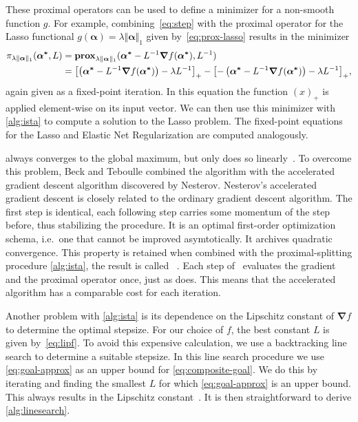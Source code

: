 These proximal operators can be used to define a minimizer for a non-smooth
function \(g\).
For example, combining~\cref{eq:step} with the proximal operator for the
Lasso functional \(g(\bm{\alpha}) = \lambda \Vert \bm{\alpha} \Vert_1\) given by~\cref{eq:prox-lasso} results in
the minimizer
\begin{align*}
  \pi_{\lambda \Vert \bm{\alpha} \Vert_1}(\bm{\alpha^*} ,L)
  &=  \prox[\(\lambda \Vert \bm{\alpha} \Vert_1\)]{\bm{\alpha^*} - L^{-1} \bm{\nabla} f (\bm{\alpha^*})}{L^{-1}} \\
  &= {\left[ \left(\bm{\alpha^*} - L^{-1} \bm{\nabla} f (\bm{\alpha^*}) \right) - \lambda L^{-1} \right]}_+ -
    {\left[ -\left(\bm{\alpha^*} - L^{-1} \bm{\nabla} f (\bm{\alpha^*}) \right) - \lambda L^{-1} \right]}_+,
\end{align*}
again given as a fixed-point iteration.
In this equation the function \( \left( x \right)_+ \) is applied element-wise on its input vector.
We can then use this minimizer with \cref{alg:ista} to compute a solution to
the Lasso problem.
The fixed-point equations for the Lasso and Elastic Net Regularization are
computed analogously.

\ista always converges to the global maximum, but only does so linearly~\cite{fista}.
To overcome this problem, Beck and Teboulle combined the \ista algorithm with
the accelerated gradient descent algorithm discovered by Nesterov. 
Nesterov's accelerated gradient descent is closely related to the ordinary
gradient descent algorithm.
The first step is identical, each following step carries some momentum of the
step before, thus stabilizing the procedure.
It is an optimal first-order optimization schema, i.e.~one that cannot be
improved asymtotically.
It archives quadratic convergence.
This property is retained when combined with the proximal-splitting procedure \cref{alg:ista}, the result is called \fista~\cite{fista}.
Each step of \fista\ evaluates the gradient and the proximal operator once, just as \ista does.
This means that the accelerated algorithm has a comparable cost for each iteration.

Another problem with \cref{alg:ista} is its dependence on the Lipschitz constant of
\(\bm{\nabla} f\) to determine the optimal stepsize.
For our choice of \(f\), the best constant \(L\) is given by~\cref{eq:lipf}.
To avoid this expensive calculation, we use a backtracking line search to
determine a suitable stepsize.
In this line search procedure we use \cref{eq:goal-approx} as an upper bound for \cref{eq:composite-goal}.
We do this by iterating and finding the smallest \(L\) for which
\cref{eq:goal-approx} is an upper bound.
This always results in the Lipschitz constant~\cite{fista}.
It is then straightforward to derive \cref{alg:linesearch}.

